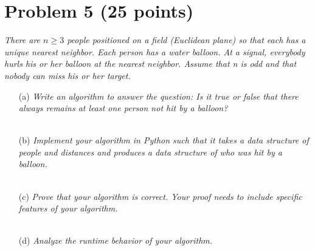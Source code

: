 \documentclass[12pt]{article}
\begin{document}
{\section*{{\selectfont Problem 5 (25 points)}}\vspace{-10mm}
\textsl{There are $n \geq 3$ people positioned on a field (Euclidean plane) so that each has a unique nearest neighbor. Each person has a water balloon. At a signal, everybody hurls his or her balloon at the nearest neighbor. Assume that n is odd and that nobody can miss his or her target.}
\begin{enumerate}
\item[(a)]\textsl{Write an algorithm to answer the question: Is it true or false that there always remains at least one person not hit by a balloon?}\\ \\
\item[(b)]\textsl{Implement your algorithm in Python such that it takes a data structure of people and distances and produces a data structure of who was hit by a balloon.}\\ \\
\item[(c)]\textsl{Prove that your algorithm is correct. Your proof needs to include specific features of your algorithm.}\\ \\
\item[(d)]\textsl{Analyze the runtime behavior of your algorithm.}\\ \\
\end{enumerate}
}
\end{document}
